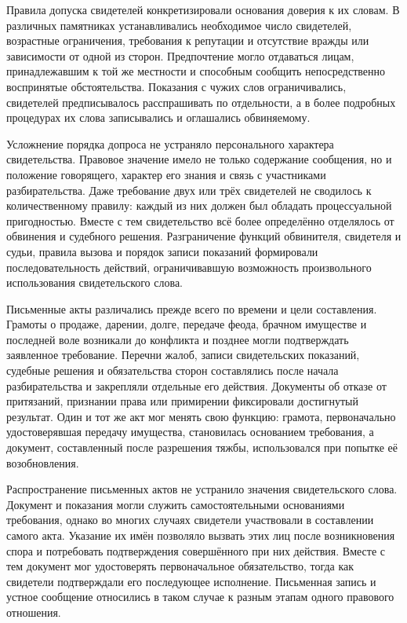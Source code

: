 Правила допуска свидетелей конкретизировали основания доверия к их словам. В различных памятниках устанавливались необходимое число свидетелей, возрастные ограничения, требования к репутации и отсутствие вражды или зависимости от одной из сторон. Предпочтение могло отдаваться лицам, принадлежавшим к той же местности и способным сообщить непосредственно воспринятые обстоятельства. Показания с чужих слов ограничивались, свидетелей предписывалось расспрашивать по отдельности, а в более подробных процедурах их слова записывались и оглашались обвиняемому.

Усложнение порядка допроса не устраняло персонального характера свидетельства. Правовое значение имело не только содержание сообщения, но и положение говорящего, характер его знания и связь с участниками разбирательства. Даже требование двух или трёх свидетелей не сводилось к количественному правилу: каждый из них должен был обладать процессуальной пригодностью. Вместе с тем свидетельство всё более определённо отделялось от обвинения и судебного решения. Разграничение функций обвинителя, свидетеля и судьи, правила вызова и порядок записи показаний формировали последовательность действий, ограничивавшую возможность произвольного использования свидетельского слова.

Письменные акты различались прежде всего по времени и цели составления. Грамоты о продаже, дарении, долге, передаче феода, брачном имуществе и последней воле возникали до конфликта и позднее могли подтверждать заявленное требование. Перечни жалоб, записи свидетельских показаний, судебные решения и обязательства сторон составлялись после начала разбирательства и закрепляли отдельные его действия. Документы об отказе от притязаний, признании права или примирении фиксировали достигнутый результат. Один и тот же акт мог менять свою функцию: грамота, первоначально удостоверявшая передачу имущества, становилась основанием требования, а документ, составленный после разрешения тяжбы, использовался при попытке её возобновления.

Распространение письменных актов не устранило значения свидетельского слова. Документ и показания могли служить самостоятельными основаниями требования, однако во многих случаях свидетели участвовали в составлении самого акта. Указание их имён позволяло вызвать этих лиц после возникновения спора и потребовать подтверждения совершённого при них действия. Вместе с тем документ мог удостоверять первоначальное обязательство, тогда как свидетели подтверждали его последующее исполнение. Письменная запись и устное сообщение относились в таком случае к разным этапам одного правового отношения.

